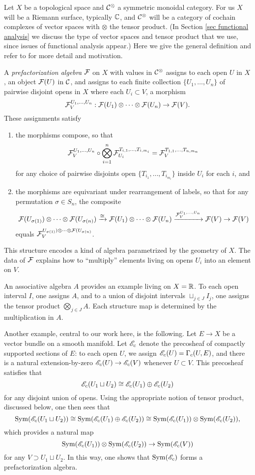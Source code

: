 Let $X$ be a topological space and $\mathcal C^\otimes$ a symmetric monoidal category.
For us $X$ will be a Riemann surface, typically $\mathbb C$, and 
$\mathcal C^\otimes$ will be a category of cochain complexes of vector spaces with $\otimes$ the tensor product.
(In Section \ref{sec functional analysis} we discuss the type of vector spaces and tensor product that we use,
since issues of functional analysis appear.)
Here we give the general definition and refer to \cite{CG} for more detail and motivation.

\begin{dfn}
A \emph{prefactorization algebra} $\mathcal F$ on $X$ with values in $\mathcal C^\otimes$ 
assigns to each open $U$ in $X$, an object $\mathcal F(U)$ in $\mathcal C$, and 
assigns to each finite collection $\{U_1,\ldots,U_n\}$ of pairwise disjoint opens in $X$
where each $U_i \subset V$, a morphism
\[
\mathcal F_V^{U_1,\ldots,U_n}: \mathcal F(U_1) \otimes \cdots \otimes \mathcal F(U_n) \to \mathcal F(V).
\]
These assignments satisfy
\begin{enumerate}
\item the morphisms compose, so that
\[
\mathcal F_V^{U_1,\ldots,U_n} \circ \bigotimes_{i = 1}^n \mathcal F_{U_i}^{T_{i,1},\ldots,T_{i,{m_i}}} = \mathcal F_V^{T_{1,1},\ldots,T_{n,m_n}}
\]
for any choice of pairwise disjoints open $\{T_{i_1},\ldots,T_{i_{m_i}}\}$ inside $U_i$ for each $i$, and
\item the morphisms are equivariant under rearrangement of labels, 
so that for any permutation $\sigma \in S_n$, the composite
\[
\mathcal F(U_{\sigma(1)}) \otimes \cdots \otimes \mathcal F(U_{\sigma(n)}) \xrightarrow{\cong} \mathcal F(U_1) \otimes \cdots \otimes \mathcal F(U_n) \xrightarrow{\mathcal F_V^{U_1,\ldots,U_n}} \mathcal F(V)\to \mathcal F(V)
\] 
equals $\mathcal F_V^{U_{\sigma(1)}) \otimes \cdots \otimes \mathcal F(U_{\sigma(n)}}$.
\end{enumerate}
\end{dfn}

This structure encodes a kind of algebra parametrized by the geometry of $X$.
The data of $\mathcal F$ explains how to ``multiply'' elements living on opens $U_i$ into an element on $V$.

An associative algebra $A$ provides an example living on $X = \mathbb R$.
To each open interval $I$, one assigns $A$, and 
to a union of disjoint intervals $\sqcup_{j \in J} I_j$, one assigns the tensor product $\bigotimes_{j \in J} A$.
Each structure map is determined by the multiplication in $A$.

Another example, central to our work here, is the following. 
Let $E \to X$ be a vector bundle on a smooth manifold.
Let $\mathscr E_c$ denote the precosheaf of compactly supported sections of $E$:
to each open $U$, we assign $\mathscr E_c(U) = \Gamma_c(U,E)$, and 
there is a natural extension-by-zero $\mathscr E_c(U) \to \mathscr E_c(V)$ whenever $U \subset V$.
This precosheaf satisfies that
\[
\mathscr E_c( U_1 \sqcup U_2) \cong \mathscr E_c(U_1) \oplus \mathscr E_c(U_2)
\]
for any disjoint union of opens. 
Using the appropriate notion of tensor product, discussed below, 
one then sees that
\[
{\rm Sym}(\mathscr E_c( U_1 \sqcup U_2)) \cong {\rm Sym}(\mathscr E_c(U_1) \oplus \mathscr E_c(U_2)) \cong {\rm Sym}(\mathscr E_c(U_1)) \otimes {\rm Sym}(\mathscr E_c(U_2)),
\]
which provides a natural map 
\[
{\rm Sym}(\mathscr E_c(U_1)) \otimes {\rm Sym}(\mathscr E_c(U_2)) \to{\rm Sym}(\mathscr E_c(V))
\]
for any $V \supset U_1 \sqcup U_2$.
In this way, one shows that ${\rm Sym}(\mathscr E_c)$ forms a prefactorization algebra.

